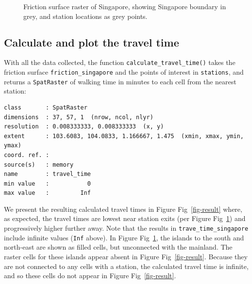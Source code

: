 \documentclass[
  10pt,
  letterpaper,
]{article}
\begin{document}
\begin{figure}


\caption{\label{fig-data}Friction surface raster of Singapore, showing
Singapore boundary in grey, and station locations as grey points.}

\end{figure}%

\subsection{Calculate and plot the travel
time}\label{calculate-and-plot-the-travel-time}

With all the data collected, the function
\texttt{calculate\_travel\_time()} takes the friction surface
\texttt{friction\_singapore} and the points of interest in
\texttt{stations}, and returns a \texttt{SpatRaster} of walking time in
minutes to each cell from the nearest station:

\begin{verbatim}
class       : SpatRaster 
dimensions  : 37, 57, 1  (nrow, ncol, nlyr)
resolution  : 0.008333333, 0.008333333  (x, y)
extent      : 103.6083, 104.0833, 1.166667, 1.475  (xmin, xmax, ymin, ymax)
coord. ref. :  
source(s)   : memory
name        : travel_time 
min value   :           0 
max value   :         Inf 
\end{verbatim}

We present the resulting calculated travel times in Figure
Fig~\ref{fig-result} where, as expected, the travel times are lowest
near station exits (per Figure Fig~\ref{fig-data}) and progressively
higher further away. Note that the results in
\texttt{trave\_time\_singapore} include infinite values (\texttt{Inf}
above). In Figure Fig~\ref{fig-data}, the islands to the south and
north-east are shown as filled cells, but unconnected with the mainland.
The raster cells for these islands appear absent in Figure
Fig~\ref{fig-result}. Because they are not connected to any cells with a
station, the calculated travel time is infinite, and so these cells do
not appear in Figure Fig~\ref{fig-result}.
\end{document}
